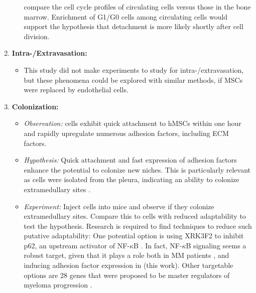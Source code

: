 \begin{enumerate}
\begin{itemize}
                        compare the cell cycle profiles of circulating cells versus
                        those in the bone marrow. Enrichment of G1/G0 cells among
                        circulating cells would support the hypothesis that detachment
                        is more likely shortly after cell division.
            \end{itemize}
      \item \textbf{Intra-/Extravasation:}
            \begin{itemize}
                  \item This study did not make experiments to study for
                        intra-/extravasation, but these phenomena could be
                        explored with similar methods, if MSCs were replaced by
                        endothelial cells.
            \end{itemize}
      \item \textbf{Colonization:}
            \begin{itemize}
                  \item \textit{Observation:} \INA cells exhibit quick
                        attachment to \acp{hMSC} within one hour and rapidly
                        upregulate numerous adhesion factors, including \ac{ECM}
                        factors.
                  \item \textit{Hypothesis:} Quick attachment and fast
                        expression of adhesion factors enhance the potential to
                        colonize new niches. This is particularly relevant as \INA
                        cells were isolated from the pleura, indicating an ability to
                        colonize extramedullary sites
                        \cite{burgerGp130RasMediated2001c}.
                  \item \textit{Experiment:} Inject \INA cells into mice and
                        observe if they colonize extramedullary sites. Compare
                        this to \INA cells with reduced adaptability to test the
                        hypothesis. Research is required to find techniques to
                        reduce such putative adaptability: One potential option
                        is using XRK3F2 to inhibit p62, an upstream activator of
                        NF-$\kappa$B \cite{adamikXRK3F2InhibitionP62ZZ2018}. In
                        fact, NF-$\kappa$B signaling seems a robust target,
                        given that it plays a role both in MM patients
                        \cite{sarinEvaluatingEfficacyMultiple2020}, and inducing
                        adhesion factor expression in \INA (this work).
                        Other targetable options are 28 genes that were proposed
                        to be master regulators of myeloma progression \cite{shenProgressionSignatureUnderlies2021}.

            \end{itemize}
\end{enumerate}


